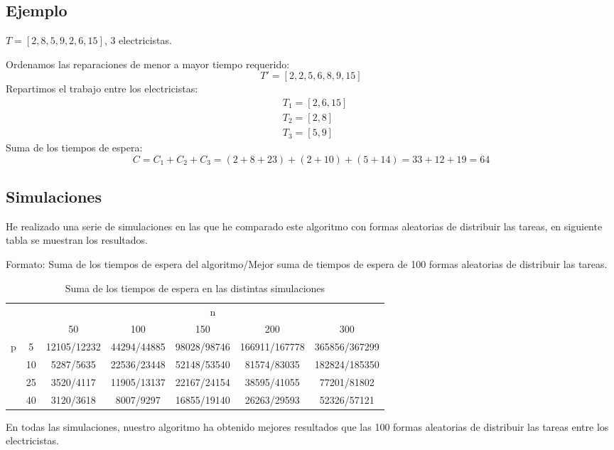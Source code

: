 \documentclass[a4]{article}
\begin{document}
\subsection{Ejemplo}
$T=[2, 8, 5, 9, 2, 6, 15]$, 3 electricistas.

Ordenamos las reparaciones de menor a mayor tiempo requerido:
\[T'=[2, 2, 5, 6, 8, 9, 15]\]
Repartimos el trabajo entre los electricistas:
\begin{align*}
  &T_1=[2,6,15] \\
  &T_2=[2,8] \\
  &T_3=[5,9]
\end{align*}
Suma de los tiempos de espera:
\[C=C_1+C_2+C_3=(2+8+23)+(2+10)+(5+14)=33+12+19=64\]

\newpage
\subsection{Simulaciones}
He realizado una serie de simulaciones en las que he comparado este
algoritmo con formas aleatorias de distribuir las tareas, en siguiente
tabla se muestran los resultados.

Formato: Suma de los tiempos de espera del algoritmo/Mejor suma de tiempos de espera de 100 formas aleatorias de distribuir las tareas.

\begin{table}[H]
\centering
\caption*{Suma de los tiempos de espera en las distintas simulaciones}
\label{tabla:simulaciones}
\begin{tabular}{|c|c|c|c|c|c|c|}
\hline
\multicolumn{2}{|c|}{\multirow{2}{*}{}} & \multicolumn{5}{c|}{n}     \\ \cline{3-7} 
\multicolumn{2}{|c|}{}                  & 50 & 100 & 150 & 200 & 300 \\ \hline
\multirow{4}{*}{p}         & 5          & 12105/12232 & 44294/44885 & 98028/98746 & 166911/167778 & 365856/367299 \\ \cline{2-7} 
                           & 10         & 5287/5635 & 22536/23448 & 52148/53540 & 81574/83035 & 182824/185350 \\ \cline{2-7} 
                           & 25         & 3520/4117 & 11905/13137 & 22167/24154 & 38595/41055 & 77201/81802 \\ \cline{2-7} 
                           & 40         & 3120/3618 & 8007/9297 & 16855/19140 & 26263/29593 & 52326/57121 \\ \hline
\end{tabular}
\end{table}

En todas las simulaciones, nuestro algoritmo ha obtenido mejores
resultados que las 100 formas aleatorias de distribuir las tareas
entre los electricistas.
\end{document}
